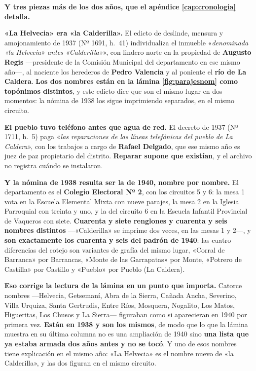 \begin{cautela}
\textbf{Y tres piezas más de los dos años, que el apéndice
\ref{cap:cronologia} detalla.}

\textbf{«La Helvecia» era «la Calderilla».} El edicto de deslinde, mensura y
amojonamiento de 1937 (Nº 1691, h.\ 41) individualiza el inmueble
«\textit{denominada «la Helvecia» antes «Calderilla»}», con lindero norte en la
propiedad de \textbf{Augusto Regis} ---presidente de la
Comisión Municipal del departamento en ese mismo año---, al naciente los
herederos de \textbf{Pedro Valencia} y al poniente el \textbf{río de La
Caldera}. \textbf{Los dos nombres están en la lámina \ref{fig:parajesnom} como
topónimos distintos}, y este edicto dice que son el mismo lugar en dos momentos:
la nómina de 1938 los sigue imprimiendo separados, en el mismo circuito.

\textbf{El pueblo tuvo teléfono antes que agua de red.} El decreto de 1937
(Nº 1711, h.\ 5) paga «\textit{las reparaciones de las líneas telefónicas del
pueblo de La Caldera}», con los trabajos a cargo de \textbf{Rafael Delgado},
que ese mismo año es juez de paz propietario del distrito. \textbf{Reparar
supone que existían}, y el archivo no registra cuándo se instalaron.

\textbf{Y la nómina de 1938 resulta ser la de 1940, nombre por nombre.} El
departamento es el \textbf{Colegio Electoral Nº 2}, con los circuitos 5 y 6: la
mesa 1 vota en la Escuela Elemental Mixta con nueve parajes, la mesa 2 en la
Iglesia Parroquial con treinta y uno, y la del circuito 6 en la Escuela
Infantil Provincial de Vaqueros con siete. \textbf{Cuarenta y siete renglones y
cuarenta y seis nombres distintos} ---«Calderilla» se imprime dos veces, en las
mesas 1 y 2---, y \textbf{son exactamente los cuarenta y seis del padrón de
1940}: las cuatro diferencias del cotejo son variantes de grafía del mismo
lugar, «Corral de Barranca» por Barrancas, «Monte de las Garrapatas» por
Monte, «Potrero de Castilla» por Castillo y «Pueblo» por Pueblo (La Caldera).

\textbf{Eso corrige la lectura de la lámina en un punto que importa.} Catorce
nombres ---Helvecia, Getsemaní, Abra de la Sierra, Cañada Ancha, Severino,
Villa Urquiza, Santa Gertrudis, Entre Ríos, Mosquera, Nogalito, Los Matos,
Higueritas, Los Chusos y La Sierra--- figuraban como si aparecieran en 1940 por
primera vez. \textbf{Están en 1938 y son los mismos}, de modo que lo que la
lámina muestra en su última columna no es una ampliación de 1940 sino
\textbf{una lista que ya estaba armada dos años antes y no se tocó}. Y uno de
esos nombres tiene explicación en el mismo año: «La Helvecia» es el nombre
nuevo de «la Calderilla», y las dos figuran en el mismo circuito.


\end{cautela}
